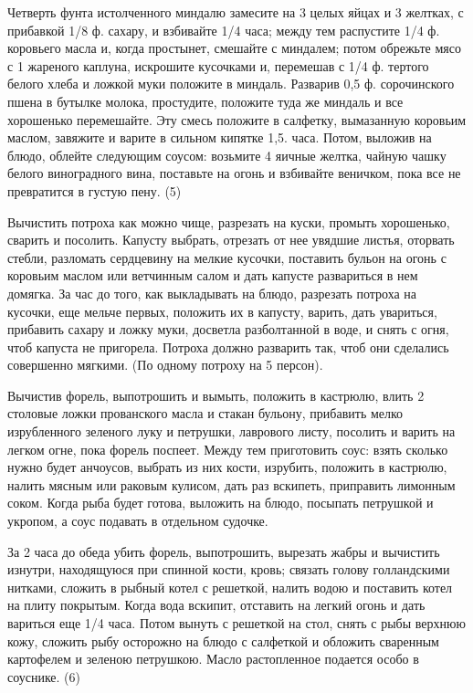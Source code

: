 
Четверть фунта истолченного миндалю замесите на 3 целых яйцах и 3 желтках, с прибавкой 1/8 ф. сахару, и взбивайте 1/4 часа; между тем распустите 1/4 ф. коровьего масла и, когда простынет, смешайте с миндалем; потом обрежьте мясо с 1 жареного каплуна, искрошите кусочками и, перемешав с 1/4 ф. тертого белого хлеба и ложкой муки положите в миндаль. Разварив 0,5 ф. сорочинского пшена в бутылке молока, простудите, положите туда же миндаль и все хорошенько перемешайте. Эту смесь положите в салфетку, вымазанную коровьим маслом, завяжите и варите в сильном кипятке 1,5. часа. Потом, выложив на блюдо, облейте следующим соусом: возьмите 4 яичные желтка, чайную чашку белого виноградного вина, поставьте на огонь и взбивайте веничком, пока все не превратится в густую пену. (5)


Вычистить потроха как можно чище, разрезать на куски, промыть хорошенько, сварить и посолить. Капусту выбрать, отрезать от нее увядшие листья, оторвать стебли, разломать сердцевину на мелкие кусочки, поставить бульон на огонь с коровьим маслом или ветчинным салом и дать капусте развариться в нем домягка. За час до того, как выкладывать на блюдо, разрезать потроха на кусочки, еще мельче первых, положить их в капусту, варить, дать увариться, прибавить сахару и ложку муки, досветла разболтанной в воде, и снять с огня, чтоб капуста не пригорела. Потроха должно разварить так, чтоб они сделались совершенно мягкими. (По одному потроху на 5 персон).


Вычистив форель, выпотрошить и вымыть, положить в кастрюлю, влить 2 столовые ложки прованского масла и стакан бульону, прибавить мелко изрубленного зеленого луку и петрушки, лаврового листу, посолить и варить на легком огне, пока форель поспеет. Между тем приготовить соус: взять сколько нужно будет анчоусов, выбрать из них кости, изрубить, положить в кастрюлю, налить мясным или раковым кулисом, дать раз вскипеть, приправить лимонным соком. Когда рыба будет готова, выложить на блюдо, посыпать петрушкой и укропом, а соус подавать в отдельном судочке. 


За 2 часа до обеда убить форель, выпотрошить, вырезать жабры и вычистить изнутри, находящуюся при спинной кости, кровь; связать голову голландскими нитками, сложить в рыбный котел с решеткой, налить водою и поставить котел на плиту покрытым. Когда вода вскипит, отставить на легкий огонь и дать вариться еще 1/4 часа. Потом вынуть с решеткой на стол, снять с рыбы верхнюю кожу, сложить рыбу осторожно на блюдо с салфеткой и обложить сваренным картофелем и зеленою петрушкою. Масло растопленное подается особо в соуснике. (6) 

